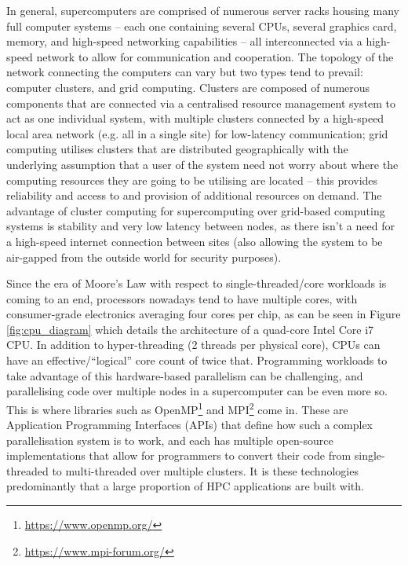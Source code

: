 \documentclass[conference]{IEEEtran}
\begin{document}
In general, supercomputers are comprised of numerous server racks housing many full computer systems – each one containing several CPUs, several graphics card, memory, and high-speed networking capabilities – all interconnected via a high-speed network to allow for communication and cooperation. The topology of the network connecting the computers can vary but two types tend to prevail: computer clusters, and grid computing. Clusters are composed of numerous components that are connected via a centralised resource management system to act as one individual system, with multiple clusters connected by a high-speed local area network (e.g. all in a single site) for low-latency communication; grid computing utilises clusters that are distributed geographically with the underlying assumption that a user of the system need not worry about where the computing resources they are going to be utilising are located – this provides reliability and access to and provision of additional resources on demand. The advantage of cluster computing for supercomputing over grid-based computing systems is stability and very low latency between nodes, as there isn’t a need for a high-speed internet connection between sites (also allowing the system to be air-gapped from the outside world for security purposes).

Since the era of Moore’s Law with respect to single-threaded/core workloads is coming to an end\cite{mooreslaw}, processors nowadays tend to have multiple cores, with consumer-grade electronics averaging four cores per chip, as can be seen in Figure \ref{fig:cpu_diagram} which details the architecture of a quad-core Intel Core i7 CPU. In addition to hyper-threading (2 threads per physical core), CPUs can have an effective/``logical” core count of twice that. Programming workloads to take advantage of this hardware-based parallelism can be challenging, and parallelising code over multiple nodes in a supercomputer can be even more so. This is where libraries such as OpenMP\footnote{\url{https://www.openmp.org/}} and MPI\footnote{\url{https://www.mpi-forum.org/}} come in. These are Application Programming Interfaces (APIs) that define how such a complex parallelisation system is to work, and each has multiple open-source implementations that allow for programmers to convert their code from single-threaded to multi-threaded over multiple clusters. It is these technologies predominantly that a large proportion of HPC applications are built with.
\end{document}
